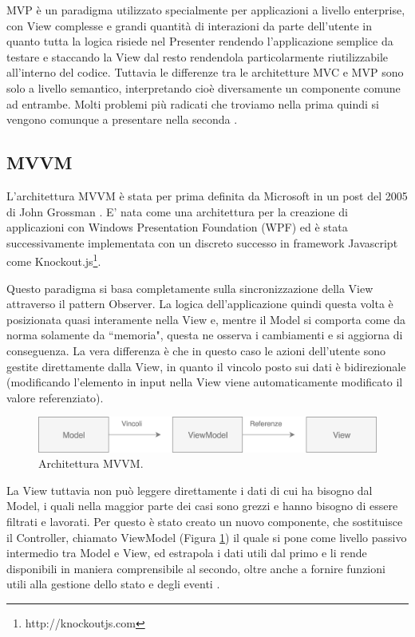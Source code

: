 MVP è un paradigma utilizzato specialmente per applicazioni a livello enterprise, con View complesse e grandi quantità di interazioni da parte dell'utente in quanto tutta la logica risiede nel Presenter rendendo l'applicazione semplice da testare e staccando la View dal resto rendendola particolarmente riutilizzabile all'interno del codice.
Tuttavia le differenze tra le architetture MVC e MVP sono solo a livello semantico, interpretando cioè diversamente un componente comune ad entrambe. Molti problemi più radicati che troviamo nella prima quindi si vengono comunque a presentare nella seconda \cite{OsmaniOnJSFrameworks}.

\subsection{MVVM}
L'architettura MVVM è stata per prima definita da Microsoft in un post del 2005 di John Grossman \cite{GossmanOnMVVM}. E' nata come una architettura per la creazione di applicazioni con Windows Presentation Foundation (WPF) ed è stata successivamente implementata con un discreto successo in framework Javascript come Knockout.js\footnote{http://knockoutjs.com}.

Questo paradigma si basa completamente sulla sincronizzazione della View attraverso il pattern Observer. La logica dell'applicazione quindi questa volta è posizionata quasi interamente nella View e, mentre il Model si comporta come da norma solamente da “memoria", questa ne osserva i cambiamenti e si aggiorna di conseguenza. La vera differenza è che in questo caso le azioni dell'utente sono gestite direttamente dalla View, in quanto il vincolo posto sui dati è bidirezionale (modificando l'elemento in input nella View viene automaticamente modificato il valore referenziato).

\begin{figure}[h]
\centering 
\vspace*{0.5cm}
\includegraphics[width=13cm]{./images/MVVMworkflow}
\caption{Architettura MVVM.}
\label{MVVMworkflow}
\vspace*{0.5cm} 
\end{figure}

La View tuttavia non può leggere direttamente i dati di cui ha bisogno dal Model, i quali nella maggior parte dei casi sono grezzi e hanno bisogno di essere filtrati e lavorati. Per questo è stato creato un nuovo componente, che sostituisce il Controller, chiamato ViewModel (Figura \ref{MVVMworkflow}) il quale si pone come livello passivo intermedio tra Model e View, ed estrapola i dati utili dal primo e li rende disponibili in maniera comprensibile al secondo, oltre anche a fornire funzioni utili alla gestione dello stato e degli eventi \cite{OsmaniOnJSFrameworks}.

